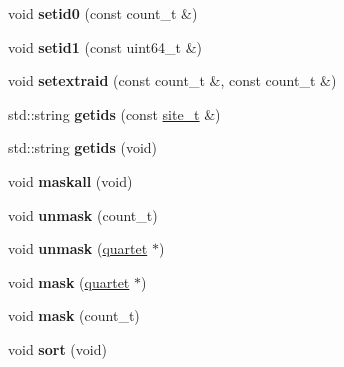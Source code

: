 \begin{DoxyCompactItemize}
\item 
\hypertarget{classprofile_a7b87cf85f7824baefe2e494e4830eddd}{void {\bfseries setid0} (const count\-\_\-t \&)}\label{classprofile_a7b87cf85f7824baefe2e494e4830eddd}

\item 
\hypertarget{classprofile_ad905db20a4ea77fc2754dc510361da8b}{void {\bfseries setid1} (const uint64\-\_\-t \&)}\label{classprofile_ad905db20a4ea77fc2754dc510361da8b}

\item 
\hypertarget{classprofile_a5c0a0502d62f66c71f1b4278339ae724}{void {\bfseries setextraid} (const count\-\_\-t \&, const count\-\_\-t \&)}\label{classprofile_a5c0a0502d62f66c71f1b4278339ae724}

\item 
\hypertarget{classprofile_af2b183b809d0beea0d1db930861a8962}{std\-::string {\bfseries getids} (const \hyperlink{classsite__t}{site\-\_\-t} \&)}\label{classprofile_af2b183b809d0beea0d1db930861a8962}

\item 
\hypertarget{classprofile_a4f382064cda45a1df2a18a86da9aaf76}{std\-::string {\bfseries getids} (void)}\label{classprofile_a4f382064cda45a1df2a18a86da9aaf76}

\item 
\hypertarget{classprofile_a7750f121c26754638453f2d7cd6782d4}{void {\bfseries maskall} (void)}\label{classprofile_a7750f121c26754638453f2d7cd6782d4}

\item 
\hypertarget{classprofile_abbd2729ca8db34ce62581475e0c0d46e}{void {\bfseries unmask} (count\-\_\-t)}\label{classprofile_abbd2729ca8db34ce62581475e0c0d46e}

\item 
\hypertarget{classprofile_a78ea7bcb2ec154335846f22a8269d9d5}{void {\bfseries unmask} (\hyperlink{structquartet}{quartet} $\ast$)}\label{classprofile_a78ea7bcb2ec154335846f22a8269d9d5}

\item 
\hypertarget{classprofile_a43a2cc362cf28433a9deb4d5055673dc}{void {\bfseries mask} (\hyperlink{structquartet}{quartet} $\ast$)}\label{classprofile_a43a2cc362cf28433a9deb4d5055673dc}

\item 
\hypertarget{classprofile_af004b22d596c12bcfa155d68b78c4b45}{void {\bfseries mask} (count\-\_\-t)}\label{classprofile_af004b22d596c12bcfa155d68b78c4b45}

\item 
\hypertarget{classprofile_acedf2b55cee28e81c3c44d41ecb51eca}{void {\bfseries sort} (void)}\label{classprofile_acedf2b55cee28e81c3c44d41ecb51eca}


\end{DoxyCompactItemize}
